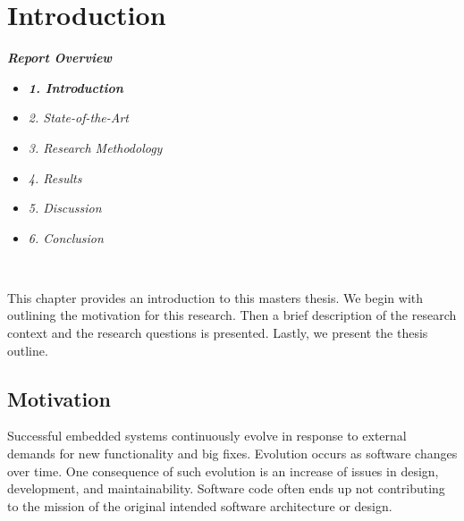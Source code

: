 
\chapter{Introduction}
\label{chap:intro}

\textit{\textbf{Report Overview}}
\begin{itemize}
	\item \textit{\textbf{1. Introduction}}
	\item \textit{2. State-of-the-Art}
	\item \textit{3. Research Methodology}
	\item \textit{4. Results}
	\item \textit{5. Discussion}
	\item \textit{6. Conclusion}
\end{itemize} \

This chapter provides an introduction to this masters thesis. We begin with outlining the motivation for this research. Then a brief description of the research context and the research questions is presented. Lastly, we present the thesis outline. 


\section{Motivation}
Successful embedded systems continuously evolve in response to external demands for new functionality and big fixes\cite{graaf2003embedded}. Evolution occurs as software changes over time. One consequence of such evolution is an increase of issues in design, development, and maintainability\cite{7381510}. Software code often ends up not contributing to the mission of the original intended software architecture or design. 

